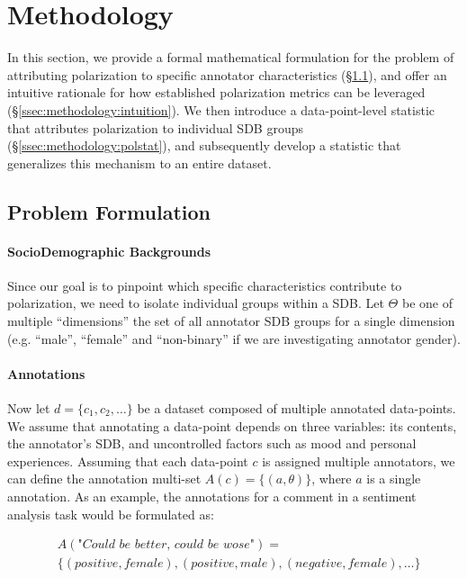 \documentclass{article}
\begin{document}
\section{Methodology}
\label{sec:methodology}

In this section, we provide a formal mathematical formulation for the problem of attributing polarization to specific annotator characteristics (\S\ref{ssec:methodology:problem}), and offer an intuitive rationale for how established polarization metrics can be leveraged (\S\ref{ssec:methodology:intuition}). We then introduce a data-point-level statistic that attributes polarization to individual \ac{SDB} groups (\S\ref{ssec:methodology:polstat}), and subsequently develop a statistic that generalizes this mechanism to an entire dataset.


\subsection{Problem Formulation}
\label{ssec:methodology:problem}

\paragraph{SocioDemographic Backgrounds }Since our goal is to pinpoint which specific characteristics contribute to polarization, we need to isolate individual groups within a \ac{SDB}. Let $\Theta$ be one of multiple ``dimensions'' the set of all annotator \ac{SDB} groups for a single dimension (e.g. ``male'', ``female'' and ``non-binary'' if we are investigating annotator gender).

\paragraph{Annotations} Now let $d = \{c_1, c_2, \ldots\}$ be a dataset composed of multiple annotated data-points. We assume that annotating a data-point depends on three variables: its contents, the annotator's \ac{SDB}, and uncontrolled factors such as mood and personal experiences. Assuming that each data-point $c$ is assigned multiple annotators, we can define the annotation multi-set $A(c)=  \{(a, \theta) \}$, where $a$ is a single annotation. As an example, the annotations for a comment in a sentiment analysis task would be formulated as:

\begin{equation}
	\begin{split}
		&A(\textit{"Could be better, could be wose"}) = \\ &\{(\textit{positive}, female), (\textit{positive}, male), (\textit{negative}, female), \ldots\}
	\end{split}
\end{equation}
\end{document}
